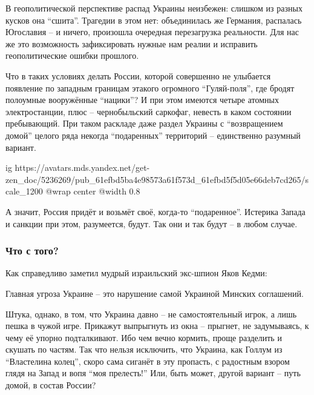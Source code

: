 \begin{zznagolos}
В геополитической перспективе распад Украины неизбежен: слишком из разных
кусков она \enquote{сшита}. Трагедии в этом нет: объединилась же Германия, распалась
Югославия – и ничего, произошла очередная перезагрузка реальности. Для нас же
это возможность зафиксировать нужные нам реалии и исправить геополитические
ошибки прошлого.	
\end{zznagolos}

Что в таких условиях делать России, которой совершенно не улыбается появление
по западным границам этакого огромного \enquote{Гуляй-поля}, где бродят полоумные
вооружённые \enquote{нацики}? И при этом имеются четыре атомных электростанции, плюс –
чернобыльский саркофаг, невесть в каком состоянии пребывающий. При таком
раскладе даже раздел Украины с \enquote{возвращением домой} целого ряда некогда
\enquote{подаренных} территорий – единственно разумный вариант.

\ifcmt
  ig https://avatars.mds.yandex.net/get-zen_doc/5236269/pub_61efbd5ba4e98573a61f573d_61efbd5f5d05e66deb7cd265/scale_1200
	@wrap center
	@width 0.8
\fi

А значит, Россия придёт и возьмёт своё, когда-то \enquote{подаренное}. Истерика Запада
и санкции при этом, разумеется, будут. Так они и так будут – в любом случае.

\subsubsection{Что с того?}

Как справедливо заметил мудрый израильский экс-шпион Яков Кедми:

\begin{zznagolos}
Главная угроза Украине – это нарушение самой Украиной Минских соглашений.	
\end{zznagolos}

Штука, однако, в том, что Украина давно – не самостоятельный игрок, а лишь
пешка в чужой игре. Прикажут выпрыгнуть из окна – прыгнет, не задумываясь, к
чему её упорно подталкивают. Ибо чем вечно кормить, проще разделить и скушать
по частям. Так что нельзя исключить, что Украина, как Голлум из
\enquote{Властелина колец}, скоро сама сиганёт в эту пропасть, с радостным
взором глядя на Запад и вопя \enquote{моя прелесть!} Или, быть может, другой
вариант – путь домой, в состав России?
